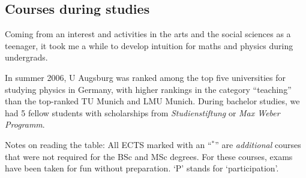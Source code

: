 
\renewcommand{\widthA}{0.7\textwidth}
\renewcommand{\widthB}{0.13\textwidth}
\renewcommand{\widthC}{0.1\textwidth}


%

\hypertarget{courses}{}
\subsection*{Courses during studies}
Coming from an interest and activities in the arts and the social sciences as a teenager, it took me a while to develop intuition for maths and physics during undergrads.

In summer 2006, U Augsburg was ranked among the top five universities for studying physics in Germany, with higher rankings in the category ``teaching'' than the top-ranked TU Munich and LMU Munich. During bachelor studies, we had 5 fellow students with scholarships from \textit{Studienstiftung} or \textit{Max Weber Programm}.

Notes on reading the table:
All ECTS marked with an ``$^*$'' are \textit{additional} courses that were not required for the BSc and MSc degrees. For these courses, exams have been taken for fun without preparation. 
`P' stands for `participation'.

